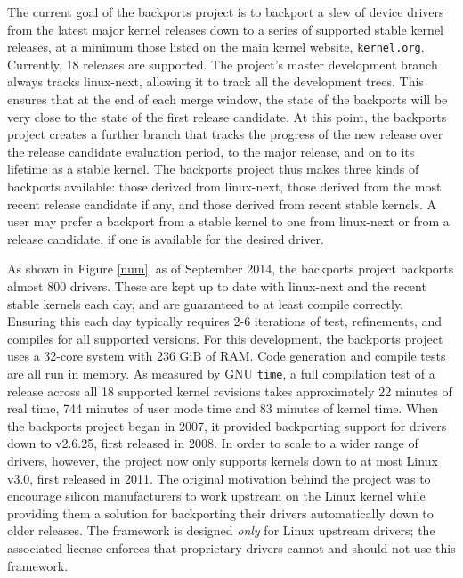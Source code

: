 The current goal of the backports project is to backport a slew of device
drivers from the latest major kernel releases down to a series of supported
stable kernel releases, at a minimum those listed on the main kernel
website, {\tt kernel.org}.  Currently, 18 releases are supported.  The
project's master development branch always tracks linux-next, allowing it
to track all the development trees. This ensures that at the end of each
merge window, the state of the backports will be very close to the state of
the first release candidate.  At this point, the backports project creates
a further branch that tracks the progress of the new release over the
release candidate evaluation period, to the major release, and on to its
lifetime as a stable kernel.  The backports project thus makes three kinds
of backports available: those derived from linux-next, those derived from
the most recent release candidate if any, and those derived from recent
stable kernels.  A user may prefer a backport from a stable kernel to one
from linux-next or from a release candidate, if one is available for the
desired driver.

As shown in Figure \ref{num}, as of September 2014, the backports project
backports almost 800 drivers.  These are kept up to date with linux-next
and the recent stable kernels each day, and are guaranteed to at least
compile correctly. Ensuring this each day typically requires 2-6 iterations
of test, refinements, and compiles for all supported versions. For this
development, the backports project uses a 32-core system with 236 GiB of
RAM.  Code generation and compile tests are all run in memory. As measured
by GNU {\tt time}, a full compilation test of a release across all 18
supported kernel revisions takes approximately 22 minutes of real time, 744
minutes of user mode time and 83 minutes of kernel time.  When the
backports project began in 2007, it provided backporting support for
drivers down to v2.6.25, first released in 2008. In order to scale to a
wider range of drivers, however, the project now only supports kernels down
to at most Linux v3.0, first released in 2011. The original motivation
behind the project was to encourage silicon manufacturers to work upstream
on the Linux kernel while providing them a solution for backporting their
drivers automatically down to older releases.  The framework is designed
{\em only} for Linux upstream drivers; the associated license enforces that
proprietary drivers cannot and should not use this framework.

